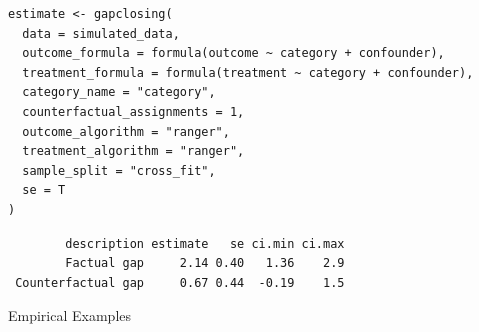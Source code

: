 \documentclass{beamer}
\begin{document}
{\begin{frame}[t,fragile]
\begin{scriptsize}
\begin{verbatim}
estimate <- gapclosing(
  data = simulated_data,
  outcome_formula = formula(outcome ~ category + confounder),
  treatment_formula = formula(treatment ~ category + confounder),
  category_name = "category",
  counterfactual_assignments = 1,
  outcome_algorithm = "ranger",
  treatment_algorithm = "ranger",
  sample_split = "cross_fit",
  se = T
)
\end{verbatim}

\begin{verbatim}
        description estimate   se ci.min ci.max
        Factual gap     2.14 0.40   1.36    2.9
 Counterfactual gap     0.67 0.44  -0.19    1.5
 \end{verbatim}
 \end{scriptsize}
\end{frame}

\begin{frame}
\Huge
Empirical Examples
\end{frame}

}
\end{document}
